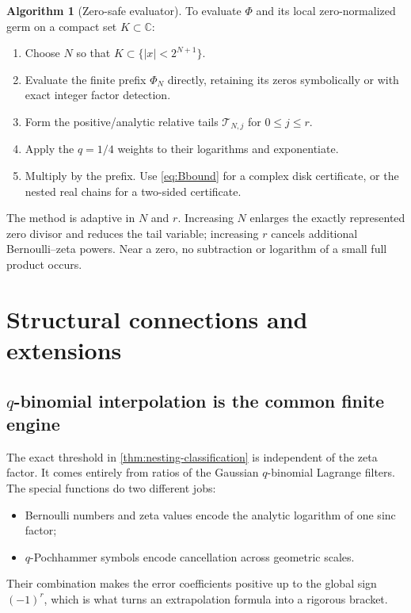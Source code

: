 \documentclass[11pt,oneside]{article}
\numberwithin{equation}{section}
\theoremstyle{frontier}
\theoremstyle{definition}
\newtheorem{algorithm}[theorem]{Algorithm}
\theoremstyle{remark}
\newcommand{\C}{\mathbb C}
\begin{document}
\begin{algorithm}[Zero-safe evaluator]\label{alg:evaluator}
To evaluate $\Phi$ and its local zero-normalized germ on a compact set $K\subset\C$:
\begin{enumerate}
\item Choose $N$ so that $K\subset\{|x|<2^{N+1}\}$.
\item Evaluate the finite prefix $\Phi_N$ directly, retaining its zeros symbolically or with
      exact integer factor detection.
\item Form the positive/analytic relative tails $\mathcal T_{N,j}$ for $0\le j\le r$.
\item Apply the $q=1/4$ weights to their logarithms and exponentiate.
\item Multiply by the prefix.  Use \eqref{eq:Bbound} for a complex disk certificate, or the
      nested real chains for a two-sided certificate.
\end{enumerate}
\end{algorithm}

The method is adaptive in $N$ and $r$.  Increasing $N$ enlarges the exactly represented zero
divisor and reduces the tail variable; increasing $r$ cancels additional Bernoulli--zeta
powers.  Near a zero, no subtraction or logarithm of a small full product occurs.

\section{Structural connections and extensions}\label{sec:connections}

\subsection{\texorpdfstring{$q$}{q}-binomial interpolation is the common finite engine}

The exact threshold in \cref{thm:nesting-classification} is independent of the zeta factor.
It comes entirely from ratios of the Gaussian $q$-binomial Lagrange filters.  The special
functions do two different jobs:
\begin{itemize}
\item Bernoulli numbers and zeta values encode the analytic logarithm of one sinc factor;
\item $q$-Pochhammer symbols encode cancellation across geometric scales.
\end{itemize}
Their combination makes the error coefficients positive up to the global sign $(-1)^r$,
which is what turns an extrapolation formula into a rigorous bracket.
\end{document}
